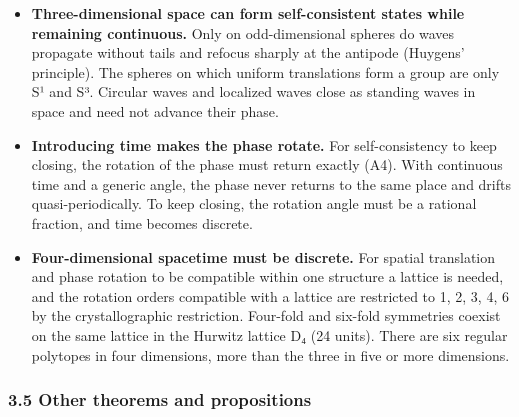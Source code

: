 \documentclass[
  a4paper,
]{article}
\providecommand{\tightlist}{%
  \setlength{\itemsep}{0pt}\setlength{\parskip}{0pt}}
\begin{document}
\begin{itemize}
\tightlist
\item
  \textbf{Three-dimensional space can form self-consistent states while
  remaining continuous.} Only on odd-dimensional spheres do waves
  propagate without tails and refocus sharply at the antipode (Huygens'
  principle). The spheres on which uniform translations form a group are
  only S¹ and S³. Circular waves and localized waves close as standing
  waves in space and need not advance their phase.
\item
  \textbf{Introducing time makes the phase rotate.} For self-consistency
  to keep closing, the rotation of the phase must return exactly (A4).
  With continuous time and a generic angle, the phase never returns to
  the same place and drifts quasi-periodically. To keep closing, the
  rotation angle must be a rational fraction, and time becomes discrete.
\item
  \textbf{Four-dimensional spacetime must be discrete.} For spatial
  translation and phase rotation to be compatible within one structure a
  lattice is needed, and the rotation orders compatible with a lattice
  are restricted to 1, 2, 3, 4, 6 by the crystallographic restriction.
  Four-fold and six-fold symmetries coexist on the same lattice in the
  Hurwitz lattice D₄ (24 units). There are six regular polytopes in four
  dimensions, more than the three in five or more dimensions.
\end{itemize}

\subsubsection{3.5 Other theorems and
propositions}\label{other-theorems-and-propositions}
\end{document}
